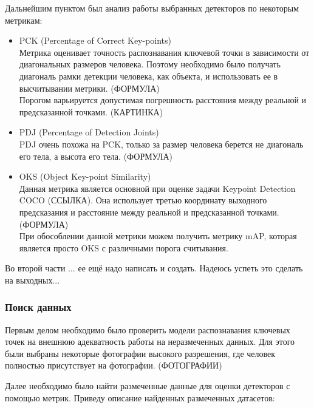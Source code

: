 Дальнейшим пунктом был анализ работы выбранных детекторов по некоторым метрикам:

\begin{itemize}
	\item PCK (Percentage of Correct Key-points)\\
	Метрика оценивает точность распознавания ключевой точки в зависимости от диагональных размеров человека. Поэтому необходимо было получать диагональ рамки детекции человека, как объекта, и использовать ее в высчитывании метрики. (ФОРМУЛА)\\
	Порогом варьируется допустимая погрешность расстояния между реальной и предсказанной точками. (КАРТИНКА)
	\item PDJ (Percentage of Detection Joints)\\
	PDJ очень похожа на PCK, только за размер человека берется не диагональ его тела, а высота его тела. (ФОРМУЛА)
	\item OKS (Object Key-point Similarity)\\
	Данная метрика является основной при оценке задачи Keypoint Detection COCO (ССЫЛКА). Она использует третью координату выходного предсказания и расстояние между реальной и предсказанной точками. (ФОРМУЛА)\\
	При обособлении данной метрики можем получить метрику mAP, которая является просто OKS с различными порога считывания.	
\end{itemize}

Во второй части ... ее ещё надо написать и создать. Надеюсь успеть это сделать на выходных...

\subsubsection{Поиск данных}

Первым делом необходимо было проверить модели распознавания ключевых точек на внешнюю адекватность работы на неразмеченных данных. Для этого были выбраны некоторые фотографии высокого разрешения, где человек полностью присутствует на фотографии. (ФОТОГРАФИИ)

Далее необходимо было найти размеченные данные для оценки детекторов с помощью метрик. Приведу описание найденных размеченных датасетов:

